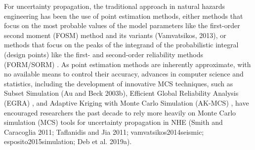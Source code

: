 For uncertainty propagation, the traditional approach in natural hazards engineering has been the use of point estimation methods, either methods that focus on the most probable values of the model parameters like the first-order second moment (FOSM) method \citep{baker2008uncertainty} and its variants (Vamvatsikos, 2013), or methods that focus on the peaks of the integrand of the probabilistic integral (design points) like the first- and second-order reliability methods (FORM/SORM) \citep{koduru2010feasibility}. As point estimation methods are inherently approximate, with no available means to control their accuracy, advances in computer science and statistics, including the development of innovative MCS techniques, such as Subset Simulation (Au and Beck 2003b), Efficient Global Reliability Analysis (EGRA) \citep{bichon2013efficient}, and Adaptive Kriging with Monte Carlo Simulation (AK-MCS) \citep{echard2011akmcs}, have encouraged researchers the past decade to rely more heavily on Monte Carlo simulation (MCS) tools for uncertainty propagation in NHE (Smith and Caracoglia 2011; Taflanidis and Jia 2011; vamvatsikos2014seismic; esposito2015simulation; Deb et al. 2019a). 

